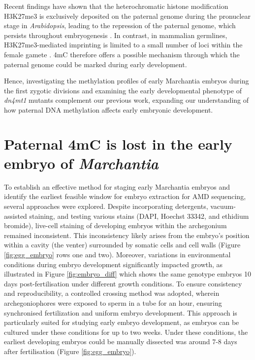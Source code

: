 Recent findings have shown that the heterochromatic histone modification H3K27me3 is exclusively deposited on the paternal genome during the pronuclear stage in \textit{Arabidopsis}, leading to the repression of the paternal genome, which persists throughout embryogenesis \cite{RN160}. In contrast, in mammalian germlines, H3K27me3-mediated imprinting is limited to a small number of loci within the female gamete \cite{RN172}. 4mC therefore offers a possible mechanism through which the paternal genome could be marked during early development.

Hence, investigating the methylation profiles of early Marchantia embryos during the first zygotic divisions and examining the early developmental phenotype of \textit{dn4mt1} mutants complement our previous work, expanding our understanding of how paternal DNA methylation affects early embryonic development.

\clearpage

\section{Paternal 4mC is lost in the early embryo of \textit{Marchantia}}

To establish an effective method for staging early Marchantia embryos and identify the earliest feasible window for embryo extraction for AMD sequencing, several approaches were explored. Despite incorporating detergents, vacuum-assisted staining, and testing various stains (DAPI, Hoechst 33342, and ethidium bromide), live-cell staining of developing embryos within the archegonium remained inconsistent. This inconsistency likely arises from the embryo's position within a cavity (the venter) surrounded by somatic cells and cell walls (Figure \ref{fig:egg_embryo} rows one and two). Moreover, variations in environmental conditions during embryo development significantly impacted growth, as illustrated in Figure \ref{fig:embryo_diff} which shows the same genotype embryos 10 days post-fertilisation under different growth conditions. To ensure consistency and reproducibility, a controlled crossing method was adopted, wherein archegoniophores were exposed to sperm in a tube for an hour, ensuring synchronised fertilization and uniform embryo development. This approach is particularly suited for studying early embryo development, as embryos can be cultured under these conditions for up to two weeks\cite{RN139}. Under these conditions, the earliest developing embryos could be manually dissected was around 7-8 days after fertilisation (Figure \ref{fig:egg_embryo}).

